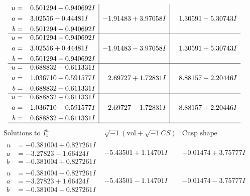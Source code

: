 \documentclass[1p]{elsarticle_modified}
\theoremstyle{definition}
\newcommand{\I}{\sqrt{-1}}
\begin{document}
$$\begin{array}{c|c|c}
\begin{aligned}
u &= \phantom{-}0.501294 + 0.940692 I \\
a &= \phantom{-}3.02556 - 0.44481 I \\
b &= \phantom{-}0.501294 + 0.940692 I\end{aligned}
 & -1.91483 + 3.97058 I & \phantom{-}1.30591 - 5.30743 I \\ \hline\begin{aligned}
u &= \phantom{-}0.501294 - 0.940692 I \\
a &= \phantom{-}3.02556 + 0.44481 I \\
b &= \phantom{-}0.501294 - 0.940692 I\end{aligned}
 & -1.91483 - 3.97058 I & \phantom{-}1.30591 + 5.30743 I \\ \hline\begin{aligned}
u &= \phantom{-}0.688832 + 0.611331 I \\
a &= \phantom{-}1.036710 + 0.591577 I \\
b &= \phantom{-}0.688832 + 0.611331 I\end{aligned}
 & \phantom{-}2.69727 + 1.72831 I & \phantom{-}8.88157 - 2.20446 I \\ \hline\begin{aligned}
u &= \phantom{-}0.688832 - 0.611331 I \\
a &= \phantom{-}1.036710 - 0.591577 I \\
b &= \phantom{-}0.688832 - 0.611331 I\end{aligned}
 & \phantom{-}2.69727 - 1.72831 I & \phantom{-}8.88157 + 2.20446 I\\
 \hline 
 \end{array}$$\newpage$$\begin{array}{c|c|c}  
\text{Solutions to }I^u_{1}& \I (\text{vol} + \sqrt{-1}CS) & \text{Cusp shape}\\
 \hline 
\begin{aligned}
u &= -0.381004 + 0.827261 I \\
a &= -3.27823 - 1.66424 I \\
b &= -0.381004 + 0.827261 I\end{aligned}
 & -5.43501 + 1.14701 I & -0.01474 + 3.75777 I \\ \hline\begin{aligned}
u &= -0.381004 - 0.827261 I \\
a &= -3.27823 + 1.66424 I \\
b &= -0.381004 - 0.827261 I\end{aligned}
 & -5.43501 - 1.14701 I & -0.01474 - 3.75777 I \\ \hline\begin{aligned}

\end{aligned}
\end{array}$$
\end{document}

